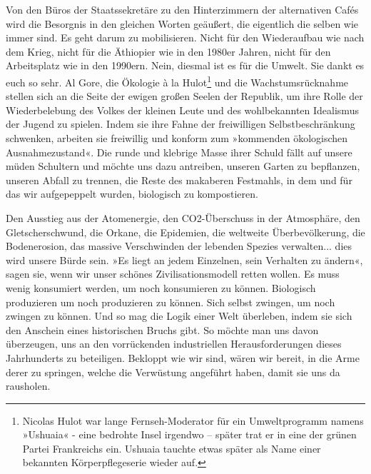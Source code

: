 Von den Büros der Staatssekretäre zu den Hinterzimmern der
alternativen Cafés wird die Besorgnis in den gleichen Worten
geäußert, die eigentlich die selben wie immer sind. Es geht darum
zu mobilisieren. Nicht für den Wiederaufbau wie nach dem Krieg,
nicht für die Äthiopier wie in den 1980er Jahren, nicht für den
Arbeitsplatz wie in den 1990ern. Nein, diesmal ist es für die
Umwelt. Sie dankt es euch so sehr. Al Gore, die Ökologie à la
Hulot\footnote{
Nicolas Hulot war lange Fernseh-Moderator für ein Umweltprogramm
namens »Ushuaia« - eine bedrohte Insel irgendwo – später trat er in
eine der grünen Partei Frankreichs ein. Ushuaia tauchte etwas
später als Name einer bekannten Körperpflegeserie wieder auf.
}%
und die Wachstumsrücknahme stellen sich an die Seite der
ewigen großen Seelen der Republik, um ihre Rolle der Wiederbelebung
des Volkes der kleinen Leute und des wohlbekannten Idealismus der
Jugend zu spielen. Indem sie ihre Fahne der freiwilligen
Selbstbeschränkung schwenken, arbeiten sie freiwillig und konform
zum »kommenden ökologischen Ausnahmezustand«. Die runde und
klebrige Masse ihrer Schuld fällt auf unsere müden Schultern und
möchte uns dazu antreiben, unseren Garten zu bepflanzen, unseren
Abfall zu trennen, die Reste des makaberen Festmahls, in dem und
für das wir aufgepeppelt wurden, biologisch zu kompostieren.

Den Ausstieg aus der Atomenergie, den CO2-Überschuss in der
Atmosphäre, den Gletscherschwund, die Orkane, die Epidemien, die
weltweite Überbevölkerung, die Bodenerosion, das massive
Verschwinden der lebenden Spezies verwalten... dies wird unsere
Bürde sein. »Es liegt an jedem Einzelnen, sein Verhalten zu
ändern«, sagen sie, wenn wir unser schönes Zivilisationsmodell
retten wollen. Es muss wenig konsumiert werden, um noch konsumieren
zu können. Biologisch produzieren um noch produzieren zu können.
Sich selbst zwingen, um noch zwingen zu können. Und so mag die
Logik einer Welt überleben, indem sie sich den Anschein eines
historischen Bruchs gibt. So möchte man uns davon überzeugen, uns
an den vorrückenden industriellen Herausforderungen dieses
Jahrhunderts zu beteiligen. Bekloppt wie wir sind, wären wir
bereit, in die Arme derer zu springen, welche die Verwüstung
angeführt haben, damit sie uns da rausholen.

\extrapar{}


